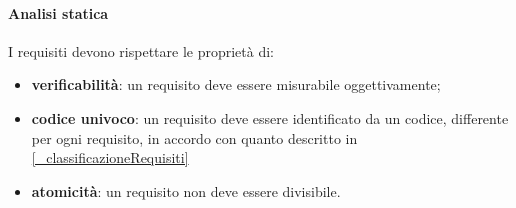 \paragraph{Analisi statica}
I requisiti devono rispettare le proprietà di:
\begin{itemize}
    \item \textbf{verificabilità}: un requisito deve essere misurabile oggettivamente;
    \item \textbf{codice univoco}: un requisito deve essere identificato da un codice, differente per ogni requisito, in accordo con quanto descritto in \ref{_classificazioneRequisiti}
    \item \textbf{atomicità}: un requisito non deve essere divisibile. %
\end{itemize}




